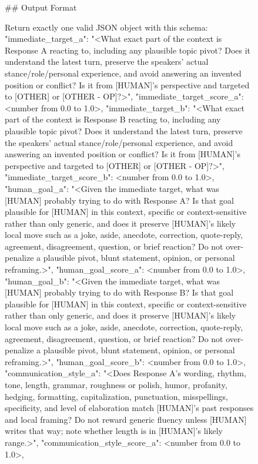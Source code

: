 \begin{figure}[p]
\centering

\begin{promptbox}
## Output Format

Return exactly one valid JSON object with this schema:
{
  "immediate_target_a": "<What exact part of the context is Response A reacting to, including any plausible topic pivot? Does it understand the latest turn, preserve the speakers' actual stance/role/personal experience, and avoid answering an invented position or conflict? Is it from [HUMAN]'s perspective and targeted to [OTHER] or [OTHER - OP]?>",
  "immediate_target_score_a": <number from 0.0 to 1.0>,
  "immediate_target_b": "<What exact part of the context is Response B reacting to, including any plausible topic pivot? Does it understand the latest turn, preserve the speakers' actual stance/role/personal experience, and avoid answering an invented position or conflict? Is it from [HUMAN]'s perspective and targeted to [OTHER] or [OTHER - OP]?>",
  "immediate_target_score_b": <number from 0.0 to 1.0>,
  "human_goal_a": "<Given the immediate target, what was [HUMAN] probably trying to do with Response A? Is that goal plausible for [HUMAN] in this context, specific or context-sensitive rather than only generic, and does it preserve [HUMAN]'s likely local move such as a joke, aside, anecdote, correction, quote-reply, agreement, disagreement, question, or brief reaction? Do not over-penalize a plausible pivot, blunt statement, opinion, or personal reframing.>",
  "human_goal_score_a": <number from 0.0 to 1.0>,
  "human_goal_b": "<Given the immediate target, what was [HUMAN] probably trying to do with Response B? Is that goal plausible for [HUMAN] in this context, specific or context-sensitive rather than only generic, and does it preserve [HUMAN]'s likely local move such as a joke, aside, anecdote, correction, quote-reply, agreement, disagreement, question, or brief reaction? Do not over-penalize a plausible pivot, blunt statement, opinion, or personal reframing.>",
  "human_goal_score_b": <number from 0.0 to 1.0>,
  "communication_style_a": "<Does Response A's wording, rhythm, tone, length, grammar, roughness or polish, humor, profanity, hedging, formatting, capitalization, punctuation, misspellings, specificity, and level of elaboration match [HUMAN]'s past responses and local framing? Do not reward generic fluency unless [HUMAN] writes that way; note whether length is in [HUMAN]'s likely range.>",
  "communication_style_score_a": <number from 0.0 to 1.0>,
}
\end{promptbox}
\end{figure}
